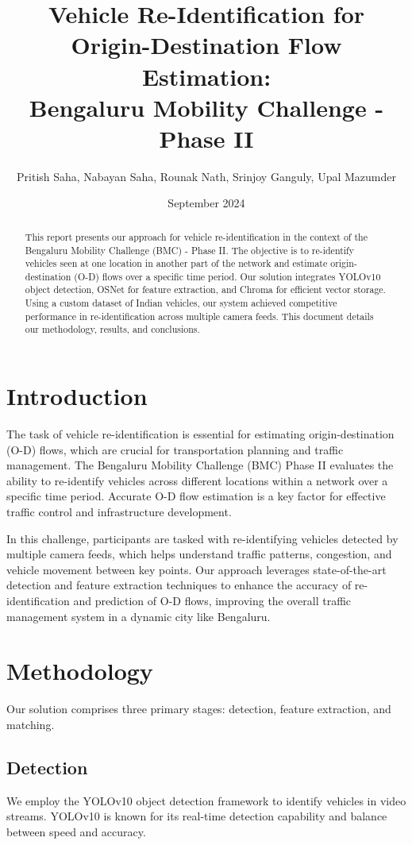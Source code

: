 \documentclass[11pt]{IEEEtran}
\title{\textbf{\Large Vehicle Re-Identification for Origin-Destination Flow
        Estimation:} \\
    \large Bengaluru Mobility Challenge - Phase II}
\author{
    Pritish Saha,
    Nabayan Saha,
    Rounak Nath,
    Srinjoy Ganguly,
    Upal Mazumder
}
\date{September 2024}
\begin{document}
\maketitle
\begin{abstract}
    This report presents our approach for vehicle re-identification in the
    context of the Bengaluru Mobility Challenge (BMC) - Phase II. The objective
    is to re-identify vehicles seen at one location in another part of the
    network
    and estimate origin-destination (O-D) flows over a specific time period.
    Our
    solution integrates YOLOv10 object detection, OSNet for feature extraction,
    and
    Chroma for efficient vector storage. Using a custom dataset of Indian
    vehicles,
    our system achieved competitive performance in re-identification across
    multiple
    camera feeds. This document details our methodology, results, and
    conclusions.
\end{abstract}

\section{Introduction}
The task of vehicle re-identification is essential for estimating
origin-destination (O-D) flows, which are crucial for transportation planning
and traffic management. The Bengaluru Mobility Challenge (BMC) Phase II
evaluates the ability to re-identify vehicles across different locations within
a network over a specific time period. Accurate O-D flow estimation is a key
factor for effective traffic control and infrastructure development.

In this challenge, participants are tasked with re-identifying vehicles
detected by multiple camera feeds, which helps understand traffic patterns,
congestion, and vehicle movement between key points. Our approach leverages
state-of-the-art detection and feature extraction techniques to enhance the
accuracy of re-identification and prediction of O-D flows, improving the
overall traffic management system in a dynamic city like Bengaluru.

\section{Methodology}
Our solution comprises three primary stages: detection, feature extraction, and
matching.

\subsection{Detection}
We employ the YOLOv10 object detection framework \cite{wang2024yolov10} to
identify vehicles in video streams. YOLOv10 is known for its real-time
detection capability and balance between speed and accuracy.
\end{document}
